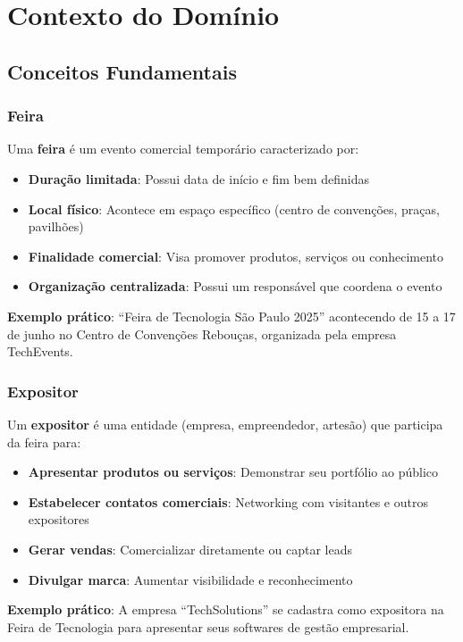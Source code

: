 \documentclass[12pt,a4paper]{article}
\begin{document}
\section{Contexto do Domínio}

\subsection{Conceitos Fundamentais}

\subsubsection{Feira}
Uma \textbf{feira} é um evento comercial temporário caracterizado por:
\begin{itemize}
    \item \textbf{Duração limitada}: Possui data de início e fim bem definidas
    \item \textbf{Local físico}: Acontece em espaço específico (centro de convenções, praças, pavilhões)
    \item \textbf{Finalidade comercial}: Visa promover produtos, serviços ou conhecimento
    \item \textbf{Organização centralizada}: Possui um responsável que coordena o evento
\end{itemize}

\textbf{Exemplo prático}: ``Feira de Tecnologia São Paulo 2025'' acontecendo de 15 a 17 de junho no Centro de Convenções Rebouças, organizada pela empresa TechEvents.

\subsubsection{Expositor}
Um \textbf{expositor} é uma entidade (empresa, empreendedor, artesão) que participa da feira para:
\begin{itemize}
    \item \textbf{Apresentar produtos ou serviços}: Demonstrar seu portfólio ao público
    \item \textbf{Estabelecer contatos comerciais}: Networking com visitantes e outros expositores
    \item \textbf{Gerar vendas}: Comercializar diretamente ou captar leads
    \item \textbf{Divulgar marca}: Aumentar visibilidade e reconhecimento
\end{itemize}

\textbf{Exemplo prático}: A empresa ``TechSolutions'' se cadastra como expositora na Feira de Tecnologia para apresentar seus softwares de gestão empresarial.
\end{document}
